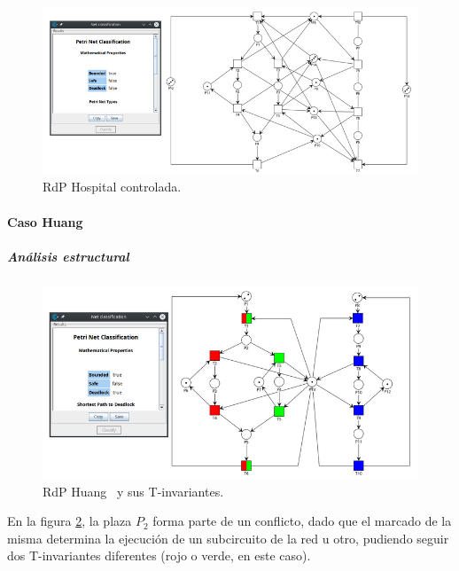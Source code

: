 \begin{figure}[H]
	\centering
	\includegraphics[width=\textwidth]{Figures/algoritmo4/hospital_imag3.png}
	\caption{RdP Hospital controlada.}
	\label{fig:Rdp-Hospital-Contv4}
\end{figure}
\bigskip

\paragraph{Caso Huang}
\subparagraph{Análisis estructural}
\hfill

\begin{figure}[H]
	\centering
	\includegraphics[width=\textwidth]{Figures/algoritmo4/huang_imag1.png}
	\caption[RdP Huang y sus T-invariantes.]{RdP Huang \footnotemark \ y sus T-invariantes.}
	\label{fig:Rdp-Huangv4}
\end{figure} 

En la figura \ref{fig:Rdp-Huangv4}, la plaza $P_2$ forma parte de un conflicto, dado que el marcado de la misma determina la ejecución de un subcircuito de la red u otro, pudiendo seguir dos T-invariantes diferentes (rojo o verde, en este caso). 

